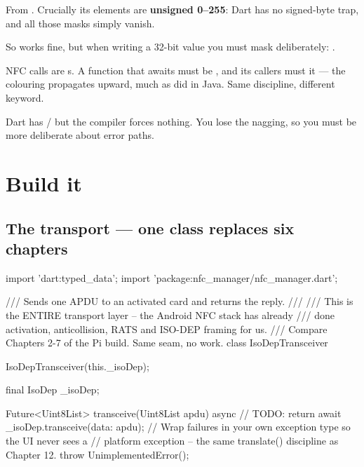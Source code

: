 \begin{description}[leftmargin=0pt, style=nextline]
  \item[\code{Uint8List}, not \code{byte[]}.] From .
        Crucially its elements are \textbf{unsigned 0--255}: Dart has no
        signed-byte trap, and all those  masks simply vanish.
  \item[\code{int} is 64-bit.] So  works fine, but when writing a
        32-bit value you must mask deliberately: .
  \item[Async is explicit.] NFC calls are s. A function that awaits
        must be , and its callers must  it --- the
        colouring propagates upward, much as  did in
        Java. Same discipline, different keyword.
  \item[No checked exceptions.] Dart has / but the
        compiler forces nothing. You lose the nagging, so you must be more
        deliberate about error paths.
\end{description}

\section{Build it}

\subsection{The transport --- one class replaces six chapters}

\begin{dcode}
import 'dart:typed_data';
import 'package:nfc_manager/nfc_manager.dart';

/// Sends one APDU to an activated card and returns the reply.
///
/// This is the ENTIRE transport layer -- the Android NFC stack has already
/// done activation, anticollision, RATS and ISO-DEP framing for us.
/// Compare Chapters 2-7 of the Pi build. Same seam, no work.
class IsoDepTransceiver {
  IsoDepTransceiver(this._isoDep);

  final IsoDep _isoDep;

  Future<Uint8List> transceive(Uint8List apdu) async {
    // TODO: return await _isoDep.transceive(data: apdu);
    //   Wrap failures in your own exception type so the UI never sees a
    //   platform exception -- the same translate() discipline as Chapter 12.
    throw UnimplementedError();
  }
}
\end{dcode}

